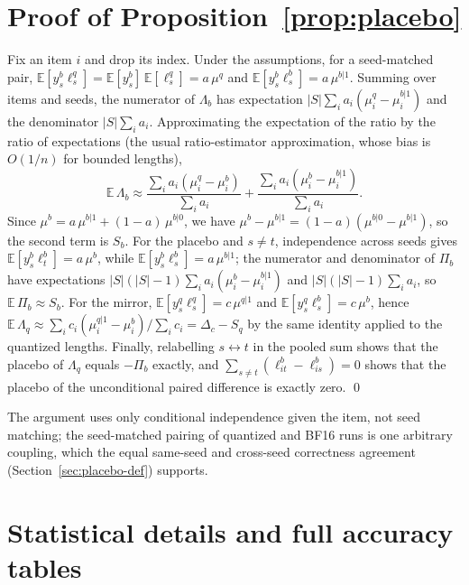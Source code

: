 \documentclass[11pt,a4paper]{article}
\begin{document}



\clearpage
\appendix

\section{Proof of Proposition~\ref{prop:placebo}}
\label{app:proof}
Fix an item $i$ and drop its index. Under the assumptions, for a seed-matched pair, $\mathbb{E}[y^b_{s}\ell^q_{s}]=\mathbb{E}[y^b_s]\,\mathbb{E}[\ell^q_s]=a\,\mu^q$ and $\mathbb{E}[y^b_s\ell^b_s]=a\,\mu^{b|1}$. Summing over items and seeds, the numerator of $\Lambda_b$ has expectation $|S|\sum_i a_i(\mu^q_i-\mu^{b|1}_i)$ and the denominator $|S|\sum_i a_i$. Approximating the expectation of the ratio by the ratio of expectations (the usual ratio-estimator approximation, whose bias is $O(1/n)$ for bounded lengths),
\[
\mathbb{E}\,\Lambda_b\approx\frac{\sum_i a_i(\mu^q_i-\mu^{b}_i)}{\sum_i a_i}+\frac{\sum_i a_i(\mu^b_i-\mu^{b|1}_i)}{\sum_i a_i}.
\]
Since $\mu^b=a\,\mu^{b|1}+(1-a)\,\mu^{b|0}$, we have $\mu^b-\mu^{b|1}=(1-a)(\mu^{b|0}-\mu^{b|1})$, so the second term is $S_b$. For the placebo and $s\neq t$, independence across seeds gives $\mathbb{E}[y^b_s\ell^b_t]=a\,\mu^b$, while $\mathbb{E}[y^b_s\ell^b_s]=a\,\mu^{b|1}$; the numerator and denominator of $\Pi_b$ have expectations $|S|(|S|-1)\sum_i a_i(\mu^b_i-\mu^{b|1}_i)$ and $|S|(|S|-1)\sum_i a_i$, so $\mathbb{E}\,\Pi_b\approx S_b$. For the mirror, $\mathbb{E}[y^q_s\ell^q_s]=c\,\mu^{q|1}$ and $\mathbb{E}[y^q_s\ell^b_s]=c\,\mu^b$, hence $\mathbb{E}\,\Lambda_q\approx\sum_i c_i(\mu^{q|1}_i-\mu^b_i)/\sum_i c_i=\Delta_c-S_q$ by the same identity applied to the quantized lengths. Finally, relabelling $s\leftrightarrow t$ in the pooled sum shows that the placebo of $\Lambda_q$ equals $-\Pi_b$ exactly, and $\sum_{s\neq t}(\ell^b_{it}-\ell^b_{is})=0$ shows that the placebo of the unconditional paired difference is exactly zero. \qed

The argument uses only conditional independence given the item, not seed matching; the seed-matched pairing of quantized and BF16 runs is one arbitrary coupling, which the equal same-seed and cross-seed correctness agreement (Section~\ref{sec:placebo-def}) supports.

\section{Statistical details and full accuracy tables}
\label{app:stats}
\end{document}
